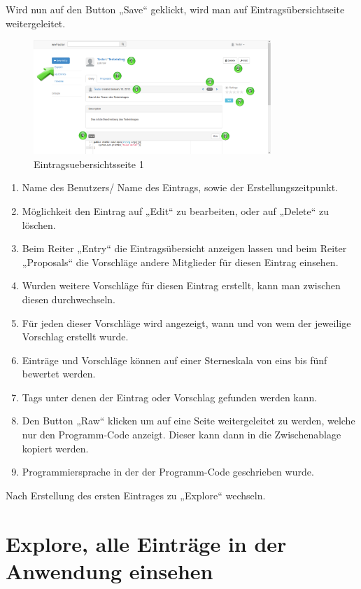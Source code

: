 Wird nun auf den Button „Save“ geklickt, wird man auf Eintragsübersichtseite weitergeleitet.

\begin{figure}[H]
    \centering
    \includegraphics[width=0.8\textwidth]{Bilder/15.png}
    \caption{Eintragsuebersichtsseite 1 }
    \label{fig:eintragsuebersichtsseite1}
\end{figure}



\begin{enumerate}
\item Name des Benutzers/ Name des Eintrags, sowie der Erstellungszeitpunkt.
\item Möglichkeit den Eintrag auf „Edit“ zu bearbeiten, oder auf „Delete“ zu löschen.
\item Beim Reiter „Entry“ die Eintragsübersicht anzeigen lassen und beim Reiter „Proposals“ die Vorschläge andere Mitglieder für diesen Eintrag einsehen.
\item Wurden weitere Vorschläge für diesen Eintrag erstellt, kann man zwischen diesen durchwechseln.
\item Für jeden dieser Vorschläge wird angezeigt, wann und von wem der jeweilige Vorschlag erstellt wurde.
\item Einträge und Vorschläge können auf einer Sterneskala von eins bis fünf bewertet werden.
\item Tags unter denen der Eintrag oder Vorschlag gefunden werden kann.
\item Den Button „Raw“ klicken um auf eine Seite weitergeleitet zu werden, welche nur den Programm-Code anzeigt. Dieser kann dann in die Zwischenablage kopiert werden.
\item Programmiersprache in der der Programm-Code geschrieben wurde.
\end{enumerate}



Nach Erstellung des ersten Eintrages zu „Explore“ wechseln.


\chapter{Explore, alle Einträge in der Anwendung einsehen}


